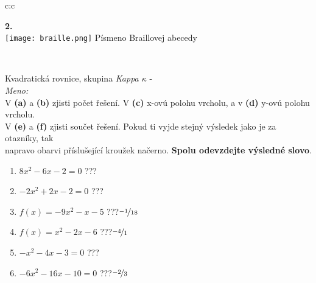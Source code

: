 \documentclass[10pt]{report}
\begin{document}
\begin{tabular}{c:c}
\begin{minipage}[c][99mm][t]{0.49\linewidth}
\begin{center}
\begin{minipage}{0.20\linewidth}
\begin{center}
{\Huge\bfseries 2.} \\[2mm]
\texttt{[image: braille.png]}
{\small Písmeno Braillovej abecedy}
\end{center}
\end{minipage}
\end{center}
\end{minipage}
\\ \hdashline
\begin{minipage}[c][99mm][t]{0.49\linewidth}
\begin{center}
\vspace{7mm}
{\huge Kvadratická rovnice, skupina \textit{Kappa $\kappa$} -}\\[4.5mm]
\textit{Meno:}\phantom{xxxxxxxxxxxxxxxxxxxxxxxxxxxxxxxxxxxxxxxxxxxxxxxxxxxxxxxxxxxxxxxxx}\\[3.5mm]
V \textbf{(a)} a \textbf{(b)} zjisti počet řešení. V \textbf{(c)} x-ovú polohu vrcholu, a v \textbf{(d)} y-ovú polohu vrcholu.\\V \textbf{(e)} a \textbf{(f)} zjisti součet řešení. Pokud ti vyjde stejný výsledek jako je za otazníky, tak\\napravo obarvi příslušející kroužek načerno. \textbf{Spolu odevzdejte výsledné slovo}.\\[3mm]
\begin{minipage}{0.77\linewidth}
\begin{center}
\begin{varwidth}{\textwidth}
\begin{enumerate}
\large
\item $8x^2-6x-2=0$\quad \dotfill\; ???\;\dotfill {}
\item $-2x^2+2x-2=0$\quad \dotfill\; ???\;\dotfill {}
\item $f(x)=-9x^2-x-5$\quad \dotfill\; ???\;\dotfill \quad $\nicefrac{-1}{18}$
\item $f(x)=x^2-2x-6$\quad \dotfill\; ???\;\dotfill \quad $\nicefrac{-4}{1}$
\item $-x^2-4x-3=0$\quad \dotfill\; ???\;\dotfill {}
\item $-6x^2-16x-10=0$\quad \dotfill\; ???\;\dotfill \quad $\nicefrac{-2}{3}$
\end{enumerate}
\end{varwidth}
\end{center}
\end{minipage}
\begin{minipage}{0.20\linewidth}
\begin{center}

\end{center}
\end{minipage}
\end{center}
\end{minipage}
\end{tabular}
\end{document}
